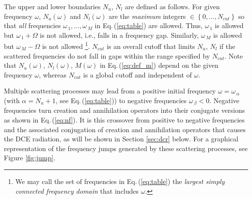 %
The upper and lower boundaries $N_u$, $N_l$ are  defined as follows. 
For given frequency $\omega$, $N_u(\omega)$ and $N_l(\omega)$
are the {\em maximum} integers $\in \left\{0, \ldots, N_{cut} \right\}$ so that {\em all} frequencies
$\omega_{\,1}, \ldots, \omega_{\,M}$ in Eq.\,(\ref{eq:table}) are allowed. 
Thus, $\omega_{\,1}$ is allowed but $\omega_{\,1} + \Omega$ 
is not allowed, i.e., falls in a frequency gap. Similarly,
$\omega_{\,M}$ is allowed but $\omega_{\,M} - \Omega$ is not allowed
%
\footnote{We may call the set of frequencies in Eq.\,(\ref{eq:table}) the {\em largest 
simply connected frequency domain} that includes $\omega$.}.
%
$N_{cut}$ is an overall cutoff that limits $N_u$, $N_l$ if the scattered frequencies 
do not fall in gaps within the range specified by $N_{cut}$. 
Note that $N_u(\omega)$, $N_l(\omega)$, $M(\omega)$ in Eq.\,(\ref{eq:def_m}) 
depend on the given frequency $\omega$, whereas $N_{cut}$ is a global cutoff 
and independent of $\omega$. 

Multiple scattering processes may lead from a positive initial frequency 
$\omega = \omega_{\,\alpha}$ (with $\alpha = N_u + 1$, see Eq.\,(\ref{eq:table}))
to negative frequencies $\omega_{\,\beta} < 0$. 
Negative frequencies turn creation and annihilation operators into their conjugate 
versions as shown in Eq.\,(\ref{eq:nf}). It is this crossover from positive to 
negative frequencies and the associated conjugation of 
creation and annihilation operators that causes the DCE radiation, 
as will be shown in Section \ref{sec:dcr} below. For a graphical representation 
of the frequency jumps generated by these scattering processes, see Figure \ref{fig:jump}.
%
\newpage

